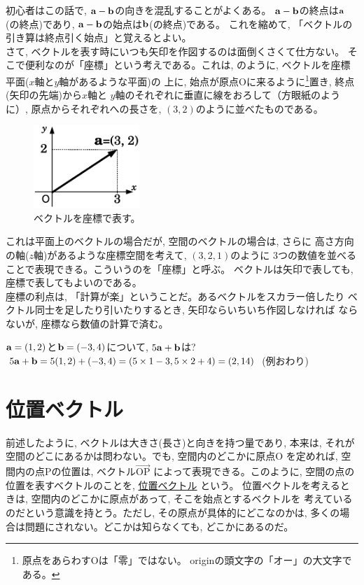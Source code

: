 初心者はこの話で, ${\bf a}-{\bf b}$の向きを混乱することがよくある。
${\bf a}-{\bf b}$の終点は${\bf a}$(の終点)であり, 
${\bf a}-{\bf b}$の始点は${\bf b}$(の終点)である。
これを縮めて, 「ベクトルの引き算は終点引く始点」と覚えるとよい。\\

さて, ベクトルを表す時にいつも矢印を作図するのは面倒くさくて仕方ない。
そこで便利なのが「座標」という考えである。これは, 
のように, ベクトルを座標平面($x$軸と$y$軸があるような平面)の
上に, 始点が原点Oに来るように\footnote{原点をあらわすOは「零」ではない。
originの頭文字の「オー」の大文字である。}置き, 終点(矢印の先端)から$x$軸と
$y$軸のそれぞれに垂直に線をおろして（方眼紙のように）, 
原点からそれぞれへの長さを, $(3, 2)$のように並べたものである。

\begin{figure}
    \centering
    \includegraphics[width=4cm]{vector_coordinate.eps}
    \caption{ベクトルを座標で表す。\label{fig:vector_coordinate}}
\end{figure}

これは平面上のベクトルの場合だが, 空間のベクトルの場合は, さらに
高さ方向の軸($z$軸)があるような座標空間を考えて, $(3, 2, 1)$のように
3つの数値を並べることで表現できる。こういうのを「座標」と呼ぶ。
ベクトルは矢印で表しても, 座標で表してもよいのである。\\

座標の利点は, 「計算が楽」ということだ。あるベクトルをスカラー倍したり
ベクトル同士を足したり引いたりするとき, 矢印ならいちいち作図しなければ
ならないが, 座標なら数値の計算で済む。

\begin{exmpl} ${\bf a}=(1, 2)$と${\bf b}=(-3, 4)$について, 
$5{\bf a}+{\bf b}$は?\\
$5{\bf a}+{\bf b}=5(1, 2)+(-3, 4)=(5\times1-3, 5\times2+4)=(2, 14)$
(例おわり)\end{exmpl}

\section{位置ベクトル}

前述したように, ベクトルは大きさ(長さ)と向きを持つ量であり, 本来は, 
それが空間のどこにあるかは問わない。でも, 空間内のどこかに原点O
を定めれば, 空間内の点Pの位置は, ベクトル$\overrightarrow{\text{OP}}$
によって表現できる。このように, 空間の点の位置を表すベクトルのことを, 
\underline{位置ベクトル} という。
位置ベクトルを考えるときは, 空間内のどこかに原点があって, そこを始点とするベクトルを
考えているのだという意識を持とう。ただし, その原点が具体的にどこなのかは, 
多くの場合は問題にされない。どこかは知らなくても, どこかにあるのだ。

